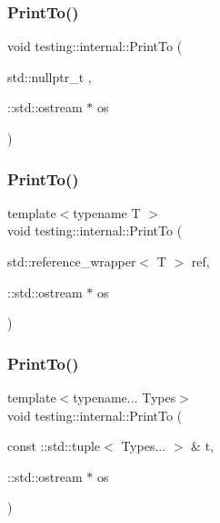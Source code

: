 \mbox{\label{namespacetesting_1_1internal_a76f564cf23190dbd5c9e088defdd092b}} 
\subsubsection{\texorpdfstring{PrintTo()}{PrintTo()}\hspace{0.1cm}{\footnotesize\ttfamily [19/23]}}
{\footnotesize\ttfamily void testing\+::internal\+::\+Print\+To (\begin{DoxyParamCaption}\item[{std\+::nullptr\+\_\+t}]{,  }\item[{\+::std\+::ostream $\ast$}]{os }\end{DoxyParamCaption})\hspace{0.3cm}{\ttfamily [inline]}}

\mbox{\label{namespacetesting_1_1internal_a5587d09db034bc597870ae86bd8c01f8}} 
\subsubsection{\texorpdfstring{PrintTo()}{PrintTo()}\hspace{0.1cm}{\footnotesize\ttfamily [20/23]}}
{\footnotesize\ttfamily template$<$typename T $>$ \\
void testing\+::internal\+::\+Print\+To (\begin{DoxyParamCaption}\item[{std\+::reference\+\_\+wrapper$<$ T $>$}]{ref,  }\item[{\+::std\+::ostream $\ast$}]{os }\end{DoxyParamCaption})}

\mbox{\label{namespacetesting_1_1internal_a5628347cba9a345f56087fdb70930fc8}} 
\subsubsection{\texorpdfstring{PrintTo()}{PrintTo()}\hspace{0.1cm}{\footnotesize\ttfamily [21/23]}}
{\footnotesize\ttfamily template$<$typename... Types$>$ \\
void testing\+::internal\+::\+Print\+To (\begin{DoxyParamCaption}\item[{const \+::std\+::tuple$<$ Types... $>$ \&}]{t,  }\item[{\+::std\+::ostream $\ast$}]{os }\end{DoxyParamCaption})}

